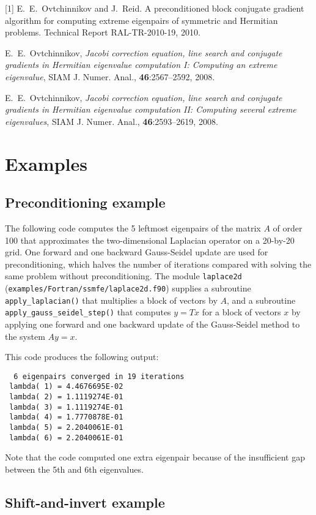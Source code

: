 [1]
E.~E.~Ovtchinnikov and J.~Reid.
A preconditioned block conjugate gradient
algorithm for computing extreme eigenpairs
of symmetric and Hermitian problems.
Technical Report RAL-TR-2010-19, 2010.

\noindent
[2]
E.~E.~Ovtchinnikov,
{\em Jacobi correction equation, line search and
conjugate gradients in Hermitian eigenvalue computation I:
Computing an extreme eigenvalue},
SIAM J. Numer. Anal., {\bf 46}:2567--2592, 2008.

\noindent
[3]
E.~E.~Ovtchinnikov,
{\em Jacobi correction equation, line search and
conjugate gradients in Hermitian eigenvalue computation II:
Computing several extreme eigenvalues},
SIAM J. Numer. Anal., {\bf 46}:2593--2619, 2008.

\section{Examples}

\subsection{Preconditioning example}
\label{ssmfe:example:precond}

The following code 
computes the 5 leftmost eigenpairs of 
the matrix $A$ of order 100 that approximates 
the two-dimensional Laplacian operator
on a 20-by-20 grid.
One forward and one backward Gauss-Seidel update
are used for preconditioning,
which halves the number of iterations
compared with solving the same problem without preconditioning.
The module {\tt laplace2d} (\texttt{examples/Fortran/ssmfe/laplace2d.f90})
supplies a subroutine {\tt apply\_laplacian()}
that multiplies a block of vectors by $A$,
and a subroutine 
{\tt apply\_gauss\_seidel\_step()}
that computes $y = T x$ for a block of vectors $x$
by applying one forward and one backward update
of the Gauss-Seidel method to the system $A y = x$.

This code produces the following output:
\begin{verbatim}
  6 eigenpairs converged in 19 iterations
 lambda( 1) = 4.4676695E-02
 lambda( 2) = 1.1119274E-01
 lambda( 3) = 1.1119274E-01
 lambda( 4) = 1.7770878E-01
 lambda( 5) = 2.2040061E-01
 lambda( 6) = 2.2040061E-01
\end{verbatim}

Note that the code computed one extra eigenpair
because of the insufficient gap between the 5th and 6th
eigenvalues.

\subsection{Shift-and-invert example}

